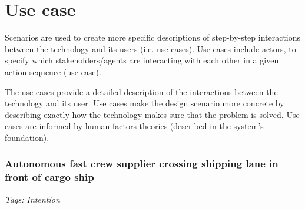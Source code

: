 \section{Use case}
Scenarios are used to create more specific descriptions of step-by-step interactions between the technology and its users (i.e. use cases). Use cases include actors, to specify which stakeholders/agents are interacting with each other in a given action sequence (use case).

The use cases provide a detailed description of the interactions between the technology and its user. Use cases make the design scenario more concrete by describing exactly how the technology makes sure that the problem is solved. Use cases are informed by human factors theories (described in the system’s foundation).

\subsubsection{Autonomous fast crew supplier crossing shipping lane in front of cargo ship}

\emph{Tags: Intention}

